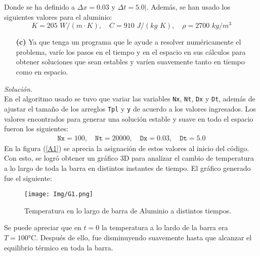 \documentclass[11pt]{article}
\begin{document}
	Donde se ha definido a $\Delta x = 0.03$ y $\Delta t = 5.0|$. Además, se han usado los siguientes valores para el aluminio:
	\begin{equation}
		K = 205\,\, \si{W/(m\cdot K)},\quad C= 910\,\, \si{J/(kg\,\, K)},\quad \rho = 2700 \,\,\si{kg/m^3}	\label{valoresal}
	\end{equation}
\begin{enumerate}
	\item [\textbf{(c)}] Ya que tenga un programa que le ayude a resolver numéricamente	el problema, varíe los pasos en el tiempo y en el espacio en sus cálculos para obtener soluciones que sean estables y varíen suavemente tanto en tiempo como en espacio.
\end{enumerate}
\textit{Solución.}\\	
	En el algoritmo usado se tuvo que variar las variables \texttt{Nx}, \texttt{Nt}, \texttt{Dx} y \texttt{Dt}, además de ajustar el tamaño de los arreglos \texttt{Tpl} y \texttt{y} de acuerdo a los valores ingresados. Los valores encontrados para generar una solución estable y suave en todo el espacio fueron los siguientes:
	\begin{align}
		\texttt{Nx} = 100,\quad \texttt{Nt} = 20000, \quad \texttt{Dx} = 0.03, \quad \texttt{Dt} = 5.0 \label{valores1}
	\end{align}
	En la figura (\ref{A1}) se aprecia la asignación de estos valores al inicio del código. Con esto, se logró obtener un gráfico 3D para analizar el cambio de temperatura a lo largo de toda la barra en distintos instantes de tiempo. El gráfico generado fue el siguiente:
	
	\begin{figure}[h]
		\centering
		\texttt{[image: Img/G1.png]}
		\caption{Temperatura en lo largo de  barra de Aluminio a distintos tiempos.}
		\label{G1}
	\end{figure}

	Se puede apreciar que en $t=0$ la temperatura a lo lardo de la barra era $T = 100 \text{°C}$. Después de ello, fue disminuyendo suavemente hasta que alcanzar el equilibrio térmico en toda la barra.
	
\end{document}
